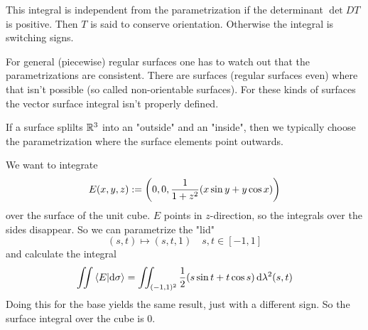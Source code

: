 \documentclass[../../script.tex]{subfiles}
\begin{document}
\begin{rem}
    This integral is independent from the parametrization if the determinant $\det DT$ is positive. Then $T$ is said to conserve orientation.
    Otherwise the integral is switching signs.

    For general (piecewise) regular surfaces one has to watch out that the parametrizations are consistent. 
    There are surfaces (regular surfaces even) where that isn't possible (so called non-orientable surfaces).
    For these kinds of surfaces the vector surface integral isn't properly defined.

    If a surface splilts $\mathbb{R}^3$ into an "outside" and an "inside", then we typically choose the parametrization where the surface elements point outwards.
\end{rem}

\begin{eg}
    We want to integrate 
    \[
        E(x, y, z) := \left(0, 0, \frac{1}{1 + z^2}(x \sin y + y \cos x)\right)
    \]
    over the surface of the unit cube. $E$ points in $z$-direction, so the integrals over the sides disappear.
    So we can parametrize the "lid"
    \[
        (s, t) \longmapsto (s, t, 1) \quad s, t \in [-1, 1]
    \]
    and calculate the integral 
    \[
        \iint \innerproduct{E}{\dd{\sigma}} = \iint_{(-1, 1)^2} \frac{1}{2} (s \sin t + t \cos s) \dd{\lambda^2(s, t)}
    \]
    Doing this for the base yields the same result, just with a different sign.
    So the surface integral over the cube is $0$.
\end{eg}
\end{document}
